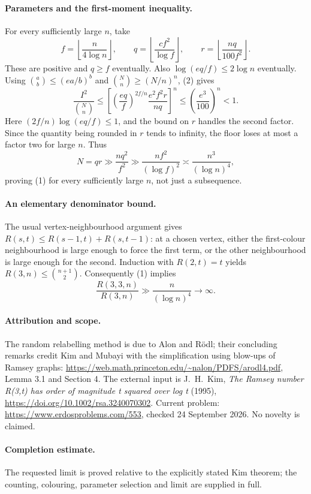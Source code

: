 \paragraph{Parameters and the first-moment inequality.}
For every sufficiently large \(n\), take
\[
 f=\left\lfloor\frac{n}{4\log n}\right\rfloor,\qquad
 q=\left\lfloor\frac{cf^2}{\log f}\right\rfloor,\qquad
 r=\left\lfloor\frac{nq}{100f^2}\right\rfloor.
\]
These are positive and \(q\geq f\) eventually. Also
\(\log(eq/f)\leq2\log n\) eventually.
Using \(\binom ab\leq(ea/b)^b\) and
\(\binom Nn\geq(N/n)^n\), (2) gives
\[
 \frac{I^2}{\binom Nn}
 \leq\left[
 \left(\frac{eq}{f}\right)^{2f/n}
 \frac{e^2f^2r}{nq}\right]^n
 \leq\left(\frac{e^3}{100}\right)^n<1. \tag{4}
\]
Here \((2f/n)\log(eq/f)\leq1\), and the bound on \(r\)
handles the second factor. Since the quantity being rounded in
\(r\) tends to infinity, the floor loses at most a factor two for
large \(n\). Thus
\[
 N=qr\gg\frac{nq^2}{f^2}
 \gg\frac{nf^2}{(\log f)^2}
 \asymp\frac{n^3}{(\log n)^4},
\]
proving (1) for every sufficiently large \(n\), not just a subsequence.

\paragraph{An elementary denominator bound.}
The usual vertex-neighbourhood argument gives
\(R(s,t)\leq R(s-1,t)+R(s,t-1)\): at a chosen vertex, either
the first-colour neighbourhood is large enough to force the first
term, or the other neighbourhood is large enough for the second.
Induction with \(R(2,t)=t\) yields
\(R(3,n)\leq\binom{n+1}{2}\).
Consequently (1) implies
\[
 \frac{R(3,3,n)}{R(3,n)}
 \gg\frac{n}{(\log n)^4}\longrightarrow\infty.
\]

\paragraph{Attribution and scope.}
The random relabelling method is due to Alon and R\"odl;
their concluding remarks credit Kim and Mubayi with the simplification
using blow-ups of Ramsey graphs:
\url{https://web.math.princeton.edu/~nalon/PDFS/arodl4.pdf},
Lemma 3.1 and Section 4.
The external input is J.~H.~Kim, \emph{The Ramsey number R(3,t) has
order of magnitude t squared over log t} (1995),
\url{https://doi.org/10.1002/rsa.3240070302}.
Current problem: \url{https://www.erdosproblems.com/553},
checked 24 September 2026. No novelty is claimed.

\paragraph{Completion estimate.}
The requested limit is proved relative to the explicitly stated Kim theorem;
the counting, colouring, parameter selection and limit are supplied in full.
